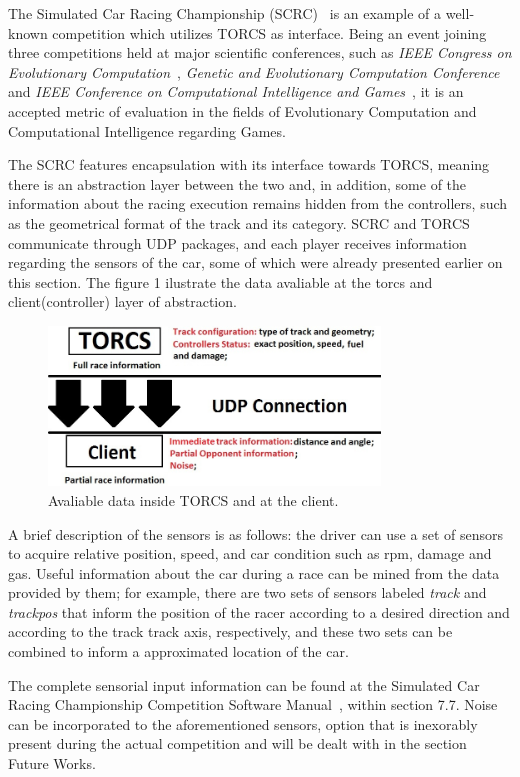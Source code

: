 	The Simulated Car Racing Championship (SCRC)~\cite{SCR} is an example of a well-known competition which utilizes
	TORCS as interface. Being an event joining three competitions held at major scientific conferences, such as
	\emph{IEEE Congress on Evolutionary Computation}~\cite{CEC}, \emph{Genetic and Evolutionary Computation
	Conference}~\cite{GECCO} and \emph{IEEE Conference on Computational Intelligence and Games}~\cite{CIG}, it is
	an accepted	metric of evaluation in the fields of Evolutionary Computation and Computational Intelligence
	regarding Games.
	
	The SCRC features encapsulation with its interface towards TORCS, meaning there is an abstraction layer between
	the two and, in addition, some of the information about the racing execution remains hidden from the controllers,
	such as the geometrical format of the track and its category. SCRC and TORCS communicate through UDP packages,
	and each player receives information regarding the sensors of the car, some of which were already presented
	earlier on this section. The figure 1 ilustrate the data avaliable at the torcs and client(controller) layer 
	of abstraction.

   	\begin{figure}[h]
	\centering
	\includegraphics[width=250pt]{Figure1}
	\caption{\label{fig:Figure1}Avaliable data inside TORCS and at the client.}
	\end{figure}
	
	A brief description of the sensors is as follows: the driver can use a set of sensors to acquire relative
	position, speed, and car condition such as rpm, damage and gas. Useful information about the car during a
	race can be mined from the data provided by them; for example, there are two sets of sensors labeled
	\emph{track} and \emph{trackpos} that inform the position of the racer according to a desired direction and
	according to the track track axis, respectively, and these two sets can be combined to inform a approximated
	location of the car.
	
	The complete sensorial input information can be found at the Simulated Car Racing Championship Competition
	Software Manual~\cite{SCRC}, within section 7.7. Noise can be incorporated to the aforementioned sensors,
	option that is inexorably present during the actual competition and will be dealt with in the section Future
	Works.

